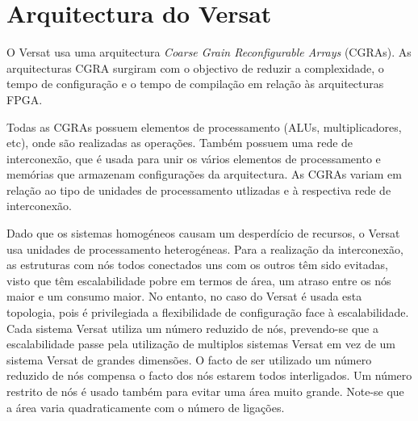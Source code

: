 \chapter{Arquitectura do Versat}
\label{chapter:Arquitectura do Versat}
\setlength{\parskip}{0 cm}
O Versat usa uma arquitectura {\it Coarse Grain Reconfigurable Arrays} (CGRAs). As arquitecturas CGRA surgiram com o objectivo de reduzir a complexidade, o tempo de configuração e o tempo de compilação em relação às arquitecturas FPGA. 

Todas as CGRAs possuem elementos de processamento (ALUs, multiplicadores, etc), onde são realizadas as operações. Também possuem uma rede de interconexão, que é usada para unir os vários elementos de processamento e memórias que armazenam configurações da arquitectura. As CGRAs variam em relação ao tipo de unidades de processamento utlizadas e à respectiva rede de interconexão. 


Dado que os sistemas homogéneos causam um desperdício de recursos, o Versat usa unidades de processamento heterogéneas. 
Para a realização da interconexão, as estruturas com nós todos conectados uns com os outros têm sido evitadas, visto que têm escalabilidade pobre em termos de área, um atraso entre os nós maior e um consumo maior. 
No entanto, no caso do Versat é usada esta topologia, pois é privilegiada a flexibilidade de configuração face à escalabilidade. Cada sistema Versat utiliza um número reduzido de nós, prevendo-se que a escalabilidade passe pela utilização de multiplos sistemas Versat em vez de um sistema Versat de grandes dimensões.
O facto de ser utilizado um número reduzido de nós compensa o facto dos nós estarem todos interligados. 
Um número restrito de nós é usado também para evitar uma área muito grande. Note-se que a área varia quadraticamente com o número de ligações.




